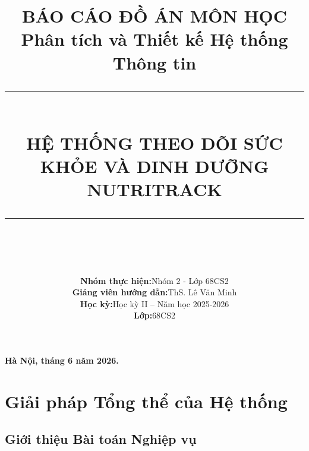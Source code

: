 \documentclass[12pt,a4paper]{article}
\begin{document}
\begin{titlepage}
\begin{center}
\vfill
\textbf{\fontsize{13pt}{16pt}\selectfont Hà Nội, tháng 6 năm 2026.}
\end{center}
\end{titlepage}

\clearpage
\pagestyle{fancy}
\fancyhf{}
\lhead{\leftmark}
\cfoot{\thepage}
\title{
    \vspace{2cm}
    \Large \textbf{BÁO CÁO ĐỒ ÁN MÔN HỌC} \\[0.5cm]
    \large Phân tích và Thiết kế Hệ thống Thông tin \\[1cm]
    \rule{\linewidth}{0.5mm} \\[0.4cm]
    {\huge \textbf{HỆ THỐNG THEO DÕI SỨC KHỎE VÀ DINH DƯỠNG}} \\[0.3cm]
    {\LARGE \textbf{NUTRITRACK}} \\[0.4cm]
    \rule{\linewidth}{0.5mm} \\[1.5cm]
}
\author{
    \begin{tabular}{ll}
        \textbf{Nhóm thực hiện:} & Nhóm 2 - Lớp 68CS2 \\
        \textbf{Giảng viên hướng dẫn:} & ThS. Lê Văn Minh \\
        \textbf{Học kỳ:} & Học kỳ II -- Năm học 2025-2026 \\
        \textbf{Lớp:} & 68CS2 \\
    \end{tabular}
}
\date{}

\maketitle
\thispagestyle{empty}
\newpage

\tableofcontents
\newpage

\section{Giải pháp Tổng thể của Hệ thống}

\subsection{Giới thiệu Bài toán Nghiệp vụ}
\end{document}
